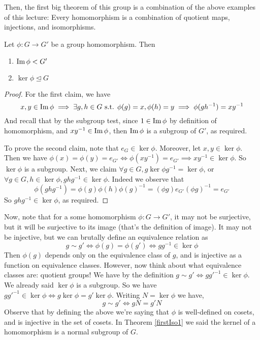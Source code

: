 Then, the first big theorem of this group is a combination of the above examples of this
lecture: Every homomorphism is a combination of quotient maps, injections, and
isomorphisms.
\begin{theorem} 
  Let $\phi:G\to G'$ be a group homomorphism. Then 
  \begin{enumerate}
    \item $\operatorname{Im}\phi < G'$
    \item $\ker\phi \trianglelefteq G$
  \end{enumerate}
  \label{firstIso1}
\end{theorem}
\begin{proof}
  For the first claim, we have
  \[x,y\in\operatorname{Im}\phi \implies \exists g,h\in G \text{ s.t. } \phi(g)=x,\phi(h)=y \implies
  \phi(gh^{-1})=xy^{-1}\]
  And recall that by the subgroup test, since $1\in\operatorname{Im}\phi$ by definition of
  homomorphism, and $xy^{-1}\in\operatorname{Im}\phi$, then $\operatorname{Im}\phi$ is a subgroup of $G'$, as
  required.

  To prove the second claim, note that $e_G\in\ker\phi$. Moreover, let $x,y\in\ker\phi$.
  Then we have $\phi (x) = \phi (y) =e_{G'}\iff \phi (xy^{-1}) = e_{G'} \implies
  xy^{-1}\in\ker\phi$. So $\ker\phi$ is a subgroup. Next, we claim $\forall g\in G,
  g\ker\phi g^{-1}= \ker\phi$, or $\forall g\in G, h\in\ker\phi,ghg^{-1}\in\ker\phi$.
  Indeed we observe that 
  \[\phi(ghg^{-1})= \phi (g)\phi (h) \phi (g)^{-1} = (\phi g)e_{G'} (\phi g)^{-1} = e_{G'}\]
  So $ghg^{-1}\in\ker\phi$, as required.
\end{proof}

Now, note that for a some homomorphism $\phi:G\to G'$, it may not be surjective, but it
will be surjective to its image (that's the definition of image). It may not be injective,
but we can brutally define an equivalence relation as 
\[g\sim g' \iff \phi(g)=\phi(g')\iff gg^{-1}\in \ker\phi\]
Then $\phi(g)$ depends only on the equivalence class of $g$, and is injective as a
function on equivalence classes. However, now think about what equivalence classes are:
quotient groups! We have by the definition $g\sim g' \iff gg'^{-1}\in \ker\phi$. We already
said $\ker\phi$ is a subgroup. So we have $gg'^{-1}\in \ker\phi \iff
g\ker\phi=g'\ker\phi$. Writing $N=\ker\phi$ we have,
\[g\sim g' \iff gN = g'N\]
Observe that by defining the above we're saying that $\phi$ is well-defined on cosets, and
is injective in the set of cosets. In Theorem \ref{firstIso1} we said the kernel of a
homomorphism is a normal subgroup of $G$.

